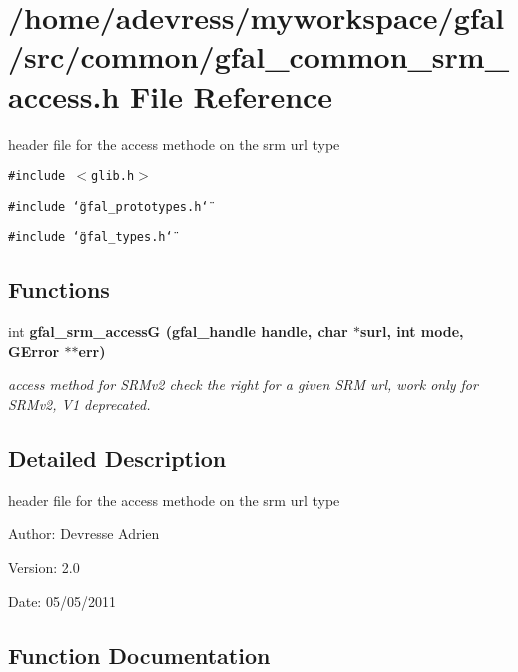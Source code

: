 \section{/home/adevress/myworkspace/gfal/src/common/gfal\_\-common\_\-srm\_\-access.h File Reference}
\label{gfal__common__srm__access_8h}
header file for the access methode on the srm url type 

{\tt \#include $<$glib.h$>$}\par
{\tt \#include \char`\"{}gfal\_\-prototypes.h\char`\"{}}\par
{\tt \#include \char`\"{}gfal\_\-types.h\char`\"{}}\par
\subsection*{Functions}
\begin{CompactItemize}
\item 
int \bf{gfal\_\-srm\_\-access\-G} (gfal\_\-handle handle, char $\ast$surl, int mode, GError $\ast$$\ast$err)
\begin{CompactList}\small\item\em access method for SRMv2 check the right for a given SRM url, work only for SRMv2, V1 deprecated. \item\end{CompactList}\end{CompactItemize}


\subsection{Detailed Description}
header file for the access methode on the srm url type 

\begin{Desc}
\item[Author:]Devresse Adrien \end{Desc}
\begin{Desc}
\item[Version:]2.0 \end{Desc}
\begin{Desc}
\item[Date:]05/05/2011 \end{Desc}


\subsection{Function Documentation}
